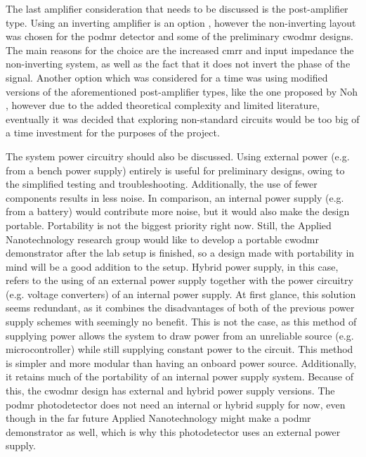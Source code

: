 The last amplifier consideration that needs to be discussed is the post-amplifier type. Using an inverting amplifier is an option \cite{acharya2025compact}, however the non-inverting layout was chosen for the \gls{podmr} detector and some of the preliminary \gls{cwodmr} designs. The main reasons for the choice are the increased \gls{cmrr} and input impedance the non-inverting system, as well as the fact that it does not invert the phase of the signal. Another option which was considered for a time was using modified versions of the aforementioned post-amplifier types, like the one proposed by Noh \cite{noh2020frequency}, however due to the added theoretical complexity and limited literature, eventually it was decided that exploring non-standard circuits would be too big of a time investment for the purposes of the project.


The system power circuitry should also be discussed. Using external power (e.g. from a bench power supply) entirely is useful for preliminary designs, owing to the simplified testing and troubleshooting. Additionally, the use of fewer components results in less noise. In comparison, an internal power supply (e.g. from a battery) would contribute more noise, but it would also make the design portable. Portability is not the biggest priority right now. Still, the Applied Nanotechnology research group would like to develop a portable \gls{cwodmr} demonstrator after the lab setup is finished, so a design made with portability in mind will be a good addition to the setup. Hybrid power supply, in this case, refers to the using of an external power supply together with the power circuitry (e.g. voltage converters) of an internal power supply. At first glance, this solution seems redundant, as it combines the disadvantages of both of the previous power supply schemes with seemingly no benefit. This is not the case, as this method of supplying power allows the system to draw power from an unreliable source (e.g. microcontroller) while still supplying constant power to the circuit. This method is simpler and more modular than having an onboard power source. Additionally, it retains much of the portability of an internal power supply system. Because of this, the \gls{cwodmr} design has external and hybrid power supply versions. The \gls{podmr} photodetector does not need an internal or hybrid supply for now, even though in the far future Applied Nanotechnology might make a \gls{podmr} demonstrator as well, which  is why this photodetector uses an external power supply.

